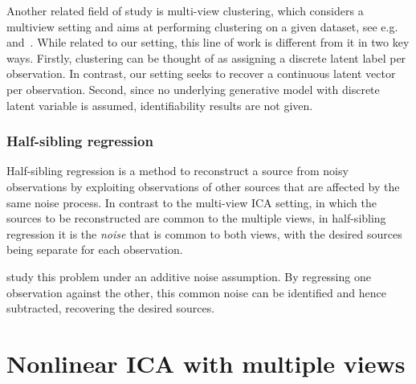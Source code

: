 Another related field of study is multi-view clustering, which considers a multiview setting and aims at performing clustering on a given dataset, see e.g.~\cite{de2005spectral} and~\cite{kumar2011co}. While related to our setting, this line of work is different from it in two key ways.
Firstly, clustering can be thought of as assigning a discrete latent label per observation. In contrast, our setting seeks to recover a continuous latent vector per observation.
Second, since no underlying generative model with discrete latent variable is assumed, identifiability results are not given.



\subsubsection{Half-sibling regression}
\label{sec:hsr}
Half-sibling regression \citep{scholkopf2016modeling} is a method to reconstruct a source from noisy observations by exploiting observations of other sources that are affected by the same noise process.
In contrast to the multi-view ICA setting, in which the sources to be reconstructed are common to the multiple views, in half-sibling regression it is the \emph{noise} that is common to both views, with the desired sources being separate for each observation.

\cite{scholkopf2016modeling} study this problem under an additive noise assumption. 
By regressing one observation against the other, this common noise can be identified and hence subtracted, recovering the desired sources.

%

\section{Nonlinear ICA with multiple views}\label{sec:ica-nonlinear-ica-with-mulitple-views}

